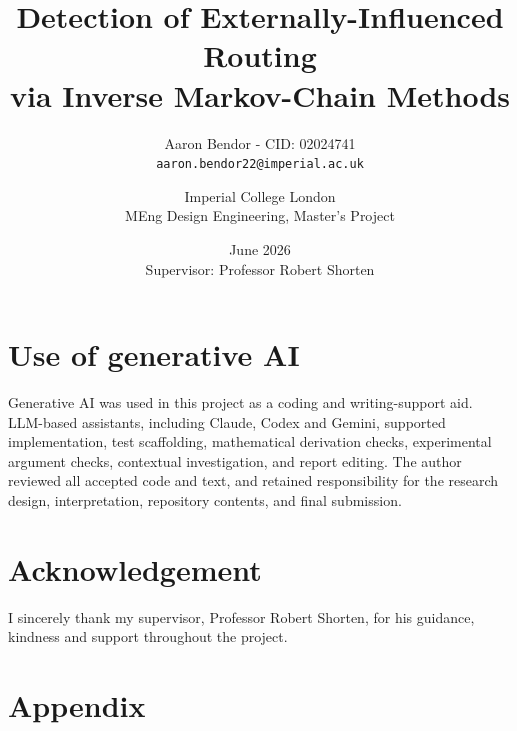 \documentclass[12pt,a4paper]{article}
\title{\bfseries
  Detection of Externally-Influenced Routing\\
  via Inverse Markov-Chain Methods
}
\author{
  Aaron Bendor - CID: 02024741\\
  \texttt{aaron.bendor22@imperial.ac.uk}
  \and
  Imperial College London\\
  MEng Design Engineering, Master's Project
}
\date{June 2026\\[0.5em]\normalsize Supervisor: Professor Robert Shorten}
\begin{document}

\maketitle
\thispagestyle{empty}



\section*{Use of generative AI}
\noindent Generative AI was used in this project as a coding and writing-support
aid. LLM-based assistants, including Claude, Codex and Gemini, supported
implementation, test scaffolding, mathematical derivation checks,
experimental argument checks, contextual investigation, and report editing. The author reviewed all
accepted code and text, and retained responsibility for the research
design, interpretation, repository contents, and final submission.

\section*{Acknowledgement}
\noindent I sincerely thank my supervisor, Professor Robert Shorten, for his guidance, kindness and support throughout the project.
\newpage
\tableofcontents

\newpage


\newpage














\newpage
{}
{}


\newpage
\appendix
{}
\section*{Appendix}

\end{document}

